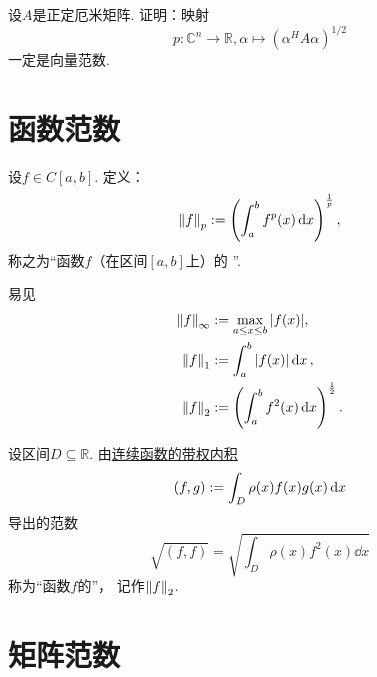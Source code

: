 \begin{example}%
设\(A\)是正定厄米矩阵.
证明：映射\begin{equation*}
	p\colon \mathbb{C}^n \to \mathbb{R},
	\alpha \mapsto (\alpha^H A \alpha)^{1/2}
\end{equation*}
一定是向量范数.
\end{example}

\section{函数范数}
\begin{definition}%
设\(f \in C[a,b]\).
定义：\begin{equation}
	\norm{f}_p
	:=
	\left( \int_a^b f^p(x) \dd{x} \right)^{\frac1p},
\end{equation}
称之为“函数\(f\)（在区间\([a,b]\)上）的 ”.
\end{definition}

易见\begin{align}
	\norm{f}_\infty
	&:=
	\max_{a \leq x \leq b} \abs{f(x)},
		\label{equation:范数.连续函数的无穷范数} \\
	\norm{f}_1
	&:=
	\int_a^b \abs{f(x)} \dd{x}, \\
	\norm{f}_2
	&:=
	\left( \int_a^b f^2(x) \dd{x} \right)^{\frac12}.
		\label{equation:范数.连续函数的L2范数}
\end{align}

\begin{definition}\label{definition:范数.连续函数的带权范数}
设区间\(D \subseteq \mathbb{R}\).
由\hyperref[definition:欧几里得空间.连续函数的带权内积]{连续函数的带权内积}
\begin{equation*}
	(f,g)
	:=
	\int_D \rho(x) f(x) g(x) \dd{x}
\end{equation*}
导出的范数\begin{equation*}
	\sqrt{(f,f)}
	= \sqrt{
		\int_D \rho(x) f^2(x) \dd{x}
	}
\end{equation*}
称为“函数\(f\)的”，
记作\(\norm{f}_2\).
\end{definition}

\section{矩阵范数}

